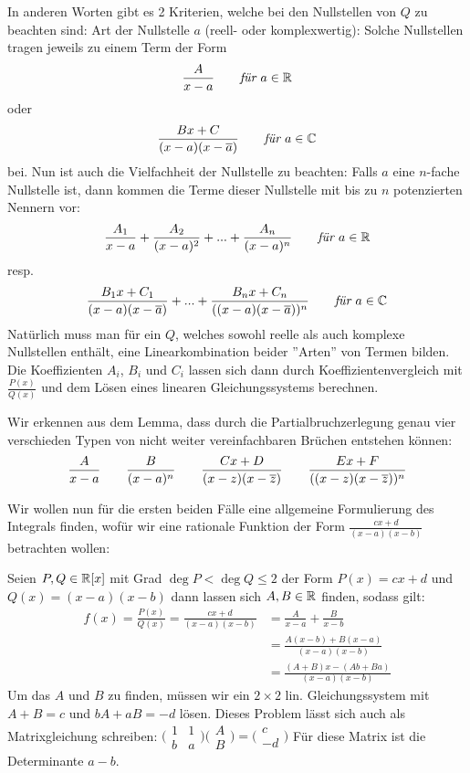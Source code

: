 In anderen Worten gibt es 2 Kriterien, welche bei den Nullstellen von $Q$ zu beachten sind: Art der Nullstelle $a$ (reell- oder komplexwertig): Solche Nullstellen tragen jeweils zu einem Term der Form
$$\frac{A}{x-a} \qquad \textit{für }a \in \mathbb{R}$$
oder
$$\frac{B x + C}{(x-a)(x- \overline{a})} \qquad \textit{für }a \in \mathbb{C}$$
bei. Nun ist auch die Vielfachheit der Nullstelle zu beachten: Falls $a$ eine $n$-fache Nullstelle ist, dann kommen die Terme dieser Nullstelle mit bis zu $n$ potenzierten Nennern vor:
$$\frac{A_1}{x-a}+\frac{A_2}{(x-a)^2}+...+\frac{A_n}{(x-a)^n} \qquad \textit{für }a \in \mathbb{R}$$
resp.
$$\frac{B_1 x + C_1}{(x-a)(x- \overline{a})}+...+\frac{B_n x + C_n}{((x-a)(x- \overline{a}))^n} \qquad \textit{für }a \in \mathbb{C}$$
Natürlich muss man für ein $Q$, welches sowohl reelle als auch komplexe Nullstellen enthält, eine Linearkombination beider ''Arten'' von Termen bilden. Die Koeffizienten $A_i$, $B_i$ und $C_i$ lassen sich dann durch Koeffizientenvergleich mit $\frac{P(x)}{Q(x)}$ und dem Lösen eines linearen Gleichungssystems berechnen.

Wir erkennen aus dem Lemma, dass durch die Partialbruchzerlegung genau vier verschieden Typen von nicht weiter vereinfachbaren Brüchen entstehen können:
\begin{align*}
    \frac{A}{x-a} \qquad
    \frac{B}{(x-a)^n} \qquad
    \frac{Cx + D}{(x-z)(x- \overline{z})} \qquad
    \frac{Ex + F}{((x-z)(x- \overline{z}))^n}
\end{align*}

Wir wollen nun für die ersten beiden Fälle eine allgemeine Formulierung des Integrals finden, wofür wir eine rationale Funktion der Form $\frac{cx + d}{(x-a)(x-b)}$ betrachten wollen:

Seien $P, Q \in \mathbb{R}[x]$ mit Grad $\deg P < \deg Q \leq 2$ der Form $P(x) = cx + d$ und $Q(x) = (x-a)(x-b)$ dann lassen sich $A, B \in \mathbb{R}$ finden, sodass gilt:
\begin{align*}
    f(x) = \frac{P(x)}{Q(x)} = \frac{cx + d}{(x-a)(x-b)} &= \frac{A}{x-a} + \frac{B}{x-b}\\
    &=\frac{A(x-b)+B(x-a)}{(x-a)(x-b)}\\
    &=\frac{(A+B)x-(Ab+Ba)}{(x-a)(x-b)}
\end{align*}
Um das $A$ und $B$ zu finden, müssen wir ein $2\times2$ lin. Gleichungssystem mit $A+B = c$ und $bA+aB=-d$ lösen. Dieses Problem lässt sich auch als Matrixgleichung schreiben: $\big(\begin{smallmatrix}
  1 & 1\\
  b & a
\end{smallmatrix}\big)
\big(\begin{smallmatrix}
  A\\
  B
\end{smallmatrix}\big)=
\big(\begin{smallmatrix}
  c\\
  -d
\end{smallmatrix}\big)  $ Für diese Matrix ist die Determinante $a-b$.

